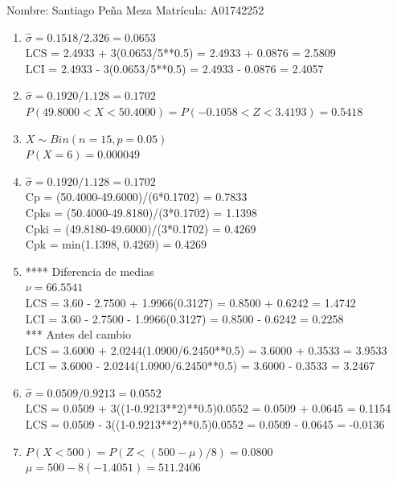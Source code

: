 \documentclass[8pt]{report}
\begin{document}
 \newpage

Nombre: \underline{\hspace*{.2in}}
Santiago Peña Meza
\underline{\hspace*{.2in}} \quad Matr\'icula:\underline{\hspace*{.2in}}
A01742252
\underline{\hspace*{.2in}} \\

\begin{enumerate}
\item $\hat\sigma = 0.1518/2.326 = 0.0653$\\
LCS = 2.4933 + 3(0.0653/5**0.5) = 2.4933 + 0.0876 = 2.5809\\
LCI = 2.4933 - 3(0.0653/5**0.5) = 2.4933 - 0.0876 = 2.4057
\item $\hat\sigma = 0.1920/1.128 = 0.1702$\\
$P(49.8000 < X < 50.4000) = P(-0.1058 < Z < 3.4193) = 0.5418$\\
\item $X \sim Bin(n=15, p=0.05)$\\
$P(X = 6) = 0.000049$
\item $\hat\sigma = 0.1920/1.128 = 0.1702$\\
Cp = (50.4000-49.6000)/(6*0.1702) = 0.7833\\
Cpks = (50.4000-49.8180)/(3*0.1702) = 1.1398\\
Cpki = (49.8180-49.6000)/(3*0.1702) = 0.4269\\
Cpk = min(1.1398, 0.4269) = 0.4269
\item **** Diferencia de medias\\
$\nu = 66.5541$\\
LCS = 3.60 - 2.7500 + 1.9966(0.3127) = 0.8500 + 0.6242 = 1.4742\\
LCI = 3.60 - 2.7500 - 1.9966(0.3127) = 0.8500 - 0.6242 = 0.2258\\
*** Antes del cambio\\
LCS = 3.6000 + 2.0244(1.0900/6.2450**0.5) = 3.6000 + 0.3533 = 3.9533\\
LCI = 3.6000 - 2.0244(1.0900/6.2450**0.5) = 3.6000 - 0.3533 = 3.2467\\
\item $\hat\sigma = 0.0509/0.9213 = 0.0552$\\
LCS = 0.0509 + 3((1-0.9213**2)**0.5)0.0552 = 0.0509 + 0.0645 = 0.1154\\
LCS = 0.0509 - 3((1-0.9213**2)**0.5)0.0552 = 0.0509 - 0.0645 = -0.0136
\item $P(X < 500) = P(Z < (500-\mu)/8) = 0.0800$\\
$\mu = 500 - 8(-1.4051) = 511.2406$\\
\end{enumerate}
\end{document}
